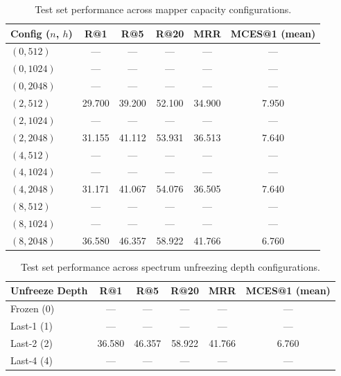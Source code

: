 \begin{table}[h]
\centering
\caption{Test set performance across mapper capacity configurations.}
\label{tab:mapper_capacity}
\begin{tabular}{lccccc}
\toprule
Config ($n$, $h$) & R@1 & R@5 & R@20 & MRR & MCES@1 (mean) \\
\midrule
$(0, 512)$ & --- & --- & --- & --- & --- \\
$(0, 1024)$ & --- & --- & --- & --- & --- \\
$(0, 2048)$ & --- & --- & --- & --- & --- \\
$(2, 512)$ & 29.700 & 39.200 & 52.100 & 34.900 & 7.950 \\
$(2, 1024)$ & --- & --- & --- & --- & --- \\
$(2, 2048)$ & 31.155 & 41.112 & 53.931 & 36.513 & 7.640 \\
$(4, 512)$ & --- & --- & --- & --- & --- \\
$(4, 1024)$ & --- & --- & --- & --- & --- \\
$(4, 2048)$ & 31.171 & 41.067 & 54.076 & 36.505 & 7.640 \\
$(8, 512)$ & --- & --- & --- & --- & --- \\
$(8, 1024)$ & --- & --- & --- & --- & --- \\
$(8, 2048)$ & 36.580 & 46.357 & 58.922 & 41.766 & 6.760 \\
\bottomrule
\end{tabular}
\end{table}

\begin{table}[h]
\centering
\caption{Test set performance across spectrum unfreezing depth configurations.}
\label{tab:unfreezing_depth}
\begin{tabular}{lccccc}
\toprule
Unfreeze Depth & R@1 & R@5 & R@20 & MRR & MCES@1 (mean) \\
\midrule
Frozen (0) & --- & --- & --- & --- & --- \\
Last-1 (1) & --- & --- & --- & --- & --- \\
Last-2 (2) & 36.580 & 46.357 & 58.922 & 41.766 & 6.760 \\
Last-4 (4) & --- & --- & --- & --- & --- \\
\bottomrule
\end{tabular}
\end{table}
